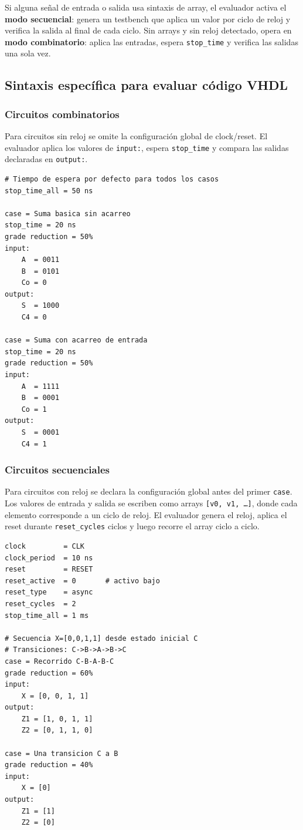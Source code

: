 \documentclass[12pt, a4paper, twoside, openany]{book}
\begin{document}
Si alguna señal de entrada o salida usa sintaxis de array, el evaluador
activa el \textbf{modo secuencial}: genera un testbench que aplica un valor
por ciclo de reloj y verifica la salida al final de cada ciclo.
Sin arrays y sin reloj detectado, opera en \textbf{modo combinatorio}:
aplica las entradas, espera \texttt{stop\_time} y verifica las salidas una
sola vez.

\subsection{Sintaxis específica para evaluar código VHDL}
\label{subsec:sintaxis-vhdl}

\subsubsection{Circuitos combinatorios}

Para circuitos sin reloj se omite la configuración global de clock/reset.
El evaluador aplica los valores de \texttt{input:}, espera \texttt{stop\_time}
y compara las salidas declaradas en \texttt{output:}.

\begin{lstlisting}[caption={Caso combinatorio --- sumador de 4 bits con acarreo},
                   label={lst:cases-comb}]
# Tiempo de espera por defecto para todos los casos
stop_time_all = 50 ns

case = Suma basica sin acarreo
stop_time = 20 ns
grade reduction = 50%
input:
    A  = 0011
    B  = 0101
    Co = 0
output:
    S  = 1000
    C4 = 0

case = Suma con acarreo de entrada
stop_time = 20 ns
grade reduction = 50%
input:
    A  = 1111
    B  = 0001
    Co = 1
output:
    S  = 0001
    C4 = 1
\end{lstlisting}

\subsubsection{Circuitos secuenciales}

Para circuitos con reloj se declara la configuración global antes del primer
\texttt{case}. Los valores de entrada y salida se escriben como arrays
\texttt{[v0, v1, \ldots]}, donde cada elemento corresponde a un ciclo de
reloj. El evaluador genera el reloj, aplica el reset durante
\texttt{reset\_cycles} ciclos y luego recorre el array ciclo a ciclo.

\begin{lstlisting}[caption={Caso secuencial --- FSM Mealy},
                   label={lst:cases-seq}]
clock         = CLK
clock_period  = 10 ns
reset         = RESET
reset_active  = 0       # activo bajo
reset_type    = async
reset_cycles  = 2
stop_time_all = 1 ms

# Secuencia X=[0,0,1,1] desde estado inicial C
# Transiciones: C->B->A->B->C
case = Recorrido C-B-A-B-C
grade reduction = 60%
input:
    X = [0, 0, 1, 1]
output:
    Z1 = [1, 0, 1, 1]
    Z2 = [0, 1, 1, 0]

case = Una transicion C a B
grade reduction = 40%
input:
    X = [0]
output:
    Z1 = [1]
    Z2 = [0]
\end{lstlisting}
\end{document}
